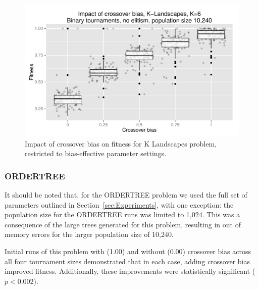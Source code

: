 \documentclass{sig-alternate}
\begin{document}
\begin{figure}
\centering
\includegraphics[width=0.45 \textwidth]{Plots/KLandscapes6_XO_bias_strong_impact_alpha_075.pdf}
\caption{Impact of crossover bias on fitness for K Landscapes problem, restricted to bias-effective parameter settings.}
\label{fig:KLandscapes6_strong_results}
\end{figure}

%
%
%
%

%
%
%
%

\subsubsection{ORDERTREE}

It should be noted that, for the ORDERTREE problem we used the full set of parameters outlined in
Section~\ref{sec:Experiments}, with one exception: the population size for the ORDERTREE runs was limited to 1,024.
This was a consequence of the large trees generated for this problem, resulting in out of memory errors for the larger
population size of 10,240.

Initial runs of this problem with (1.00) and without (0.00) crossover bias across all four tournament sizes
demonstrated that in each case, adding crossover bias improved fitness. Additionally, these improvements were
statistically significant ($p < 0.002$).
\end{document}
